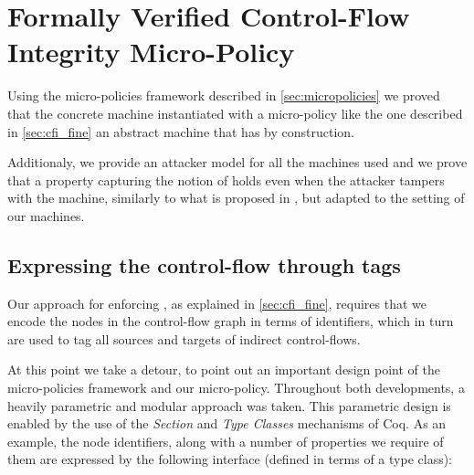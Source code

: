 \chapter{Formally Verified Control-Flow Integrity Micro-Policy}\label{ch:verified_cfi}

Using the micro-policies framework described in \ref{sec:micropolicies} we 
proved that the concrete machine instantiated with a \CFI micro-policy like the
one described in \ref{sec:cfi_fine}  an abstract machine that has
\CFI by construction.

Additionaly, we provide an attacker model for all the machines used and we prove
that a property capturing the notion of \CFI holds even when the attacker
tampers with the machine, similarly to what is proposed in \cite{abadi2005}, but
adapted to the setting of our machines.

\section{Expressing the control-flow through tags}\label{sec:cfi_tags}

Our approach for enforcing \CFI, as explained in \ref{sec:cfi_fine}, requires
that we encode the nodes in the control-flow graph in terms of identifiers,
which in turn are used to tag all sources and targets of indirect control-flows.

At this point we take a detour, to point out an important design point of 
the micro-policies framework and our \CFI micro-policy.
Throughout both developments, a heavily parametric and modular approach was 
taken. This parametric design is enabled by the use of the \emph{Section} and
\emph{Type Classes} mechanisms of Coq. As an example, the node identifiers,
along with a number of properties we require of them are expressed by the
following interface (defined in terms of a type class):

